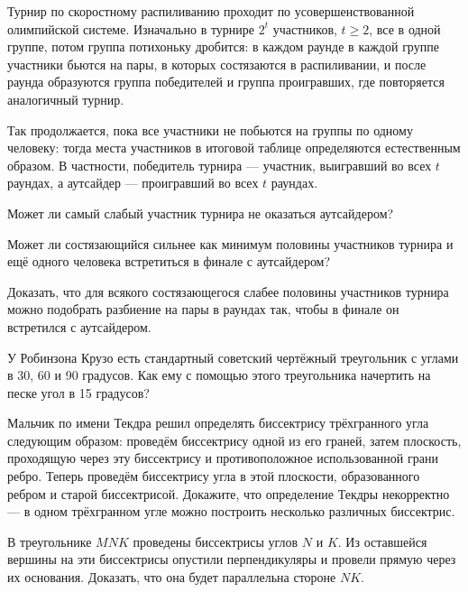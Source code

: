 Турнир по скоростному распиливанию проходит по усовершенствованной олимпийской системе. Изначально в турнире $2^t$ участников, $t \geq 2$, все в одной группе, потом группа потихоньку дробится: в каждом раунде в каждой группе участники бьются на пары, в которых состязаются в распиливании, и после раунда образуются группа победителей и группа проигравших, где повторяется аналогичный турнир.

\ms Так продолжается, пока все участники не побьются на группы по одному человеку: тогда места участников в итоговой таблице определяются естественным образом. В частности, победитель турнира — участник, выигравший во всех $t$ раундах, а аутсайдер — проигравший во всех $t$ раундах.

\begin{itemize}
\itA Может ли самый слабый участник турнира не оказаться аутсайдером?

\itB Может ли состязающийся сильнее как минимум половины участников турнира и ещё одного человека встретиться в финале с аутсайдером?

\itC Доказать, что для всякого состязающегося слабее половины участников турнира можно подобрать разбиение на пары в раундах так, чтобы в финале он встретился с аутсайдером.
\end{itemize}

\begin{itemize}
\itA У Робинзона Крузо есть стандартный советский чертёжный треугольник с углами в 30, 60 и 90 градусов. Как ему с помощью этого треугольника начертить на песке угол в 15 градусов?

\itB Мальчик по имени Текдра решил определять биссектрису трёхгранного угла следующим образом: проведём биссектрису одной из его граней, затем плоскость, проходящую через эту биссектрису и противоположное использованной грани ребро. Теперь проведём биссектрису угла в этой плоскости, образованного ребром и старой биссектрисой. Докажите, что определение Текдры некорректно — в одном трёхгранном угле можно построить несколько различных биссектрис.

\itC В треугольнике $MNK$ проведены биссектрисы углов $N$ и $K$. Из оставшейся вершины на эти биссектрисы опустили перпендикуляры и провели прямую через их основания. Доказать, что она будет параллельна стороне $NK$.
\end{itemize}
